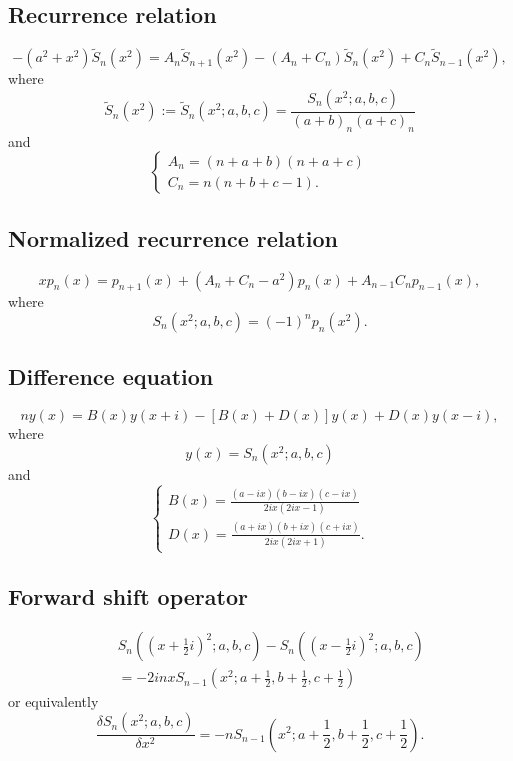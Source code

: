 \documentclass[envcountchap,graybox]{svmono}
\begin{document}
\subsection*{Recurrence relation}
\begin{equation}
\label{RecContDualHahn}
-\left(a^2+x^2\right){\tilde {S}}_n(x^2)=
A_n{\tilde {S}}_{n+1}(x^2)-\left(A_n+C_n\right){\tilde {S}}_n(x^2)+C_n{\tilde {S}}_{n-1}(x^2),
\end{equation}
where
$${\tilde {S}}_n(x^2):={\tilde {S}}_n(x^2;a,b,c)=\frac{S_n(x^2;a,b,c)}{(a+b)_n(a+c)_n}$$
and
$$\left\{\begin{array}{l}
\displaystyle A_n=(n+a+b)(n+a+c)\\[5mm]
\displaystyle C_n=n(n+b+c-1).
\end{array}\right.$$

\subsection*{Normalized recurrence relation}
\begin{equation}
\label{NormRecContDualHahn}
xp_n(x)=p_{n+1}(x)+(A_n+C_n-a^2)p_n(x)+A_{n-1}C_np_{n-1}(x),
\end{equation}
where
$$S_n(x^2;a,b,c)=(-1)^np_n(x^2).$$

\subsection*{Difference equation}
\begin{equation}
\label{dvContDualHahn}
ny(x)=B(x)y(x+i)-\left[B(x)+D(x)\right]y(x)+D(x)y(x-i),
\end{equation}
where
$$y(x)=S_n(x^2;a,b,c)$$
and
$$\left\{\begin{array}{l}
\displaystyle B(x)=\frac{(a-ix)(b-ix)(c-ix)}{2ix(2ix-1)}\\[5mm]
\displaystyle D(x)=\frac{(a+ix)(b+ix)(c+ix)}{2ix(2ix+1)}.
\end{array}\right.$$

\subsection*{Forward shift operator}
\begin{eqnarray}
\label{shift1ContDualHahnI}
& &S_n((x+\textstyle\frac{1}{2}i)^2;a,b,c)-S_n((x-\textstyle\frac{1}{2}i)^2;a,b,c)\nonumber\\
& &{}=-2inxS_{n-1}(x^2;a+\textstyle\frac{1}{2},b+\textstyle\frac{1}{2},c+\textstyle\frac{1}{2})
\end{eqnarray}
or equivalently
\begin{equation}
\label{shift1ContDualHahnII}
\frac{\delta S_n(x^2;a,b,c)}{\delta x^2}=-nS_{n-1}(x^2;a+\textstyle\frac{1}{2},
b+\textstyle\frac{1}{2},c+\textstyle\frac{1}{2}).
\end{equation}
\end{document}
